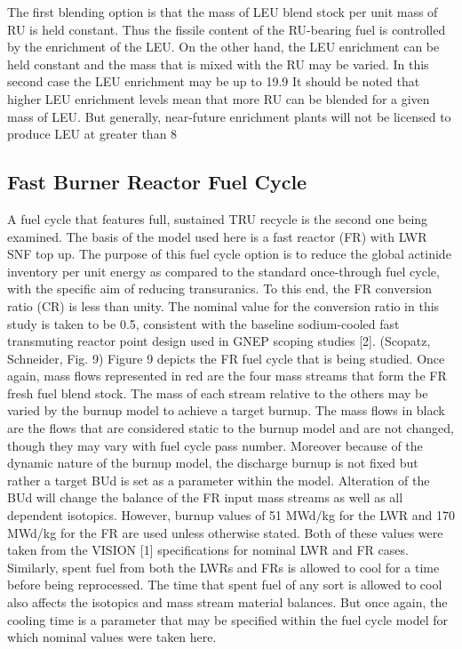 The first blending option is that the mass of LEU blend stock per unit mass of RU is held constant.  Thus the fissile content of the RU-bearing fuel is controlled by the enrichment of the LEU.  On the other hand, the LEU enrichment can be held constant and the mass that is mixed with the RU may be varied.  In this second case the LEU enrichment may be up to 19.9%
It should be noted that higher LEU enrichment levels mean that more RU can be blended for a given mass of LEU.  But generally, near-future enrichment plants will not be licensed to produce LEU at greater than 8%



\subsection{Fast Burner Reactor Fuel Cycle}
\label{1g_sec:}
A fuel cycle that features full, sustained TRU recycle is the second one being examined.  The basis of the model used here is a fast reactor (FR) with LWR SNF top up.  The purpose of this fuel cycle option is to reduce the global actinide inventory per unit energy as compared to the standard once-through fuel cycle, with the specific aim of reducing transuranics.   To this end, the FR conversion ratio (CR) is less than unity.  The nominal value for the conversion ratio in this study is taken to be 0.5, consistent with the baseline sodium-cooled fast transmuting reactor point design used in GNEP scoping studies [2].  
(Scopatz, Schneider, Fig. 9)
Figure 9 depicts the FR fuel cycle that is being studied.  Once again, mass flows represented in red are the four mass streams that form the FR fresh fuel blend stock.  The mass of each stream relative to the others may be varied by the burnup model to achieve a target burnup.  The mass flows in black are the flows that are considered static to the burnup model and are not changed, though they may vary with fuel cycle pass number.  
Moreover because of the dynamic nature of the burnup model, the discharge burnup is not fixed but rather a target BUd is set as a parameter within the model.  Alteration of the BUd will change the balance of the FR input mass streams as well as all dependent isotopics.  However, burnup values of 51 MWd/kg for the LWR and 170 MWd/kg for the FR are used unless otherwise stated.  Both of these values were taken from the VISION [1] specifications for nominal LWR and FR cases.  Similarly, spent fuel from both the LWRs and FRs is allowed to cool for a time before being reprocessed.  The time that spent fuel of any sort is allowed to cool also affects the isotopics and mass stream material balances.  But once again, the cooling time is a parameter that may be specified within the fuel cycle model for which nominal values were taken here.
